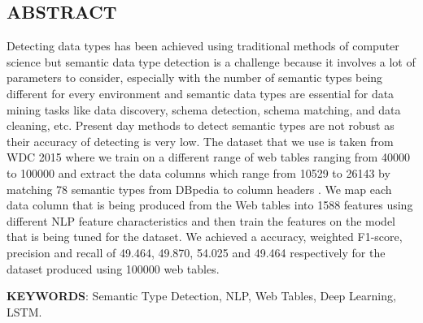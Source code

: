 \documentclass[12pt, a4paper]{report}
\theoremstyle{definition}
\numberwithin{equation}{chapter}
\numberwithin{figure}{chapter}
\numberwithin{table}{chapter}
\begin{document}
\begin{spacing}{1.5}
\chapter*{ABSTRACT}
\setlength{\parskip}{2.2em}
\setlength{\parindent}{0em}
Detecting data types has been achieved using traditional methods of computer science but semantic data type detection is a challenge because it involves a lot of parameters to consider, especially with the number of semantic types being different for every environment and semantic data types are essential for data mining tasks like data discovery, schema detection, schema matching, and data cleaning, etc. Present day methods to detect semantic types are not robust as their accuracy of detecting is very low. The dataset that we use is taken from WDC 2015 \cite{wdc} where we train on a different range of web tables ranging from 40000 to 100000 and extract the data columns which range from 10529 to 26143 by matching 78 semantic types from DBpedia to column headers \cite{dbpedia}. We map each data column that is being produced from the Web tables into 1588 features using different NLP feature characteristics and then train the features on the model that is being tuned for the dataset. We achieved a accuracy, weighted F1-score, precision and recall of 49.464, 49.870, 54.025 and 49.464 respectively for the dataset produced using 100000 web tables.
\par 
\setlength{\parskip}{2.2em}
\setlength{\parindent}{0em}
\textsc{\textbf{KEYWORDS}}: Semantic Type Detection, NLP, Web Tables, Deep Learning, LSTM.

\end{spacing}

\end{document}
